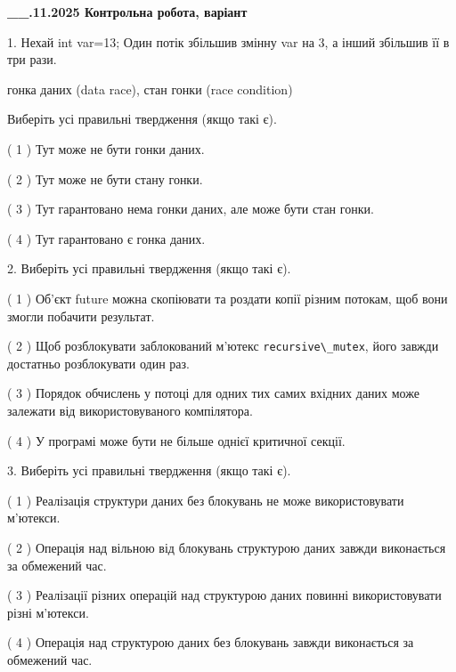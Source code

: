 \documentclass[12pt, ukrainian]{article}
\def\code#1{\Verb!#1!}
\begin{document}
\newpage
\begin {large}

\textbf{\_\_.11.2025 Контрольна робота, варіант  }\par


{
1. Нехай int var=13; Один потік збільшив змінну var на 3, а інший збільшив її в три рази.

гонка даних (data race), стан гонки (race condition)

Виберіть усі правильні твердження (якщо такі є).\par
\vspace{2mm}
( 1 ) Тут може не бути гонки даних.%

( 2 ) Тут може не бути стану гонки.%

( 3 ) Тут гарантовано нема гонки даних, але може бути стан гонки.%

( 4 ) Тут гарантовано є гонка даних.%


2. Виберіть усі правильні твердження (якщо такі є).\par
\vspace{2mm}

( 1 ) Об’єкт future можна скопіювати та роздати копії різним потокам, щоб вони змогли побачити результат.%

( 2 ) Щоб розблокувати заблокований м’ютекс \code{recursive\_mutex}, його завжди достатньо розблокувати один раз.%

( 3 ) Порядок обчислень у потоці для одних тих самих вхідних даних може залежати від використовуваного компілятора.%

( 4 ) У програмі може бути не більше однієї критичної секції.%


3. Виберіть усі правильні твердження (якщо такі є).\par
\vspace{2mm}

( 1 ) Реалізація структури даних без блокувань не може використовувати м’ютекси.%

( 2 ) Операція над вільною від блокувань структурою даних завжди виконається за обмежений час.%

( 3 ) Реалізації різних операцій над структурою даних повинні використовувати різні м’ютекси.%

( 4 ) Операція над структурою даних без блокувань завжди виконається за обмежений час.%


}
\end{large}
\end{document}
